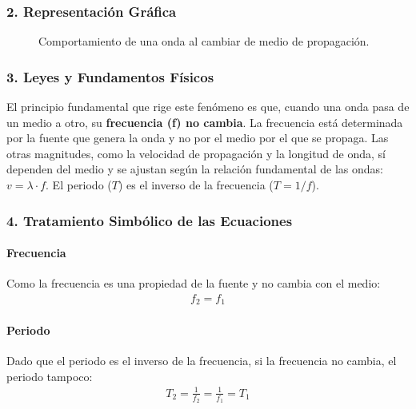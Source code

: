 \subsubsection*{2. Representación Gráfica}
\begin{figure}[H]
    \centering
    \caption{Comportamiento de una onda al cambiar de medio de propagación.}
\end{figure}

\subsubsection*{3. Leyes y Fundamentos Físicos}
El principio fundamental que rige este fenómeno es que, cuando una onda pasa de un medio a otro, su \textbf{frecuencia (f) no cambia}. La frecuencia está determinada por la fuente que genera la onda y no por el medio por el que se propaga.
Las otras magnitudes, como la velocidad de propagación y la longitud de onda, sí dependen del medio y se ajustan según la relación fundamental de las ondas: $v = \lambda \cdot f$.
El periodo ($T$) es el inverso de la frecuencia ($T=1/f$).

\subsubsection*{4. Tratamiento Simbólico de las Ecuaciones}
\paragraph{Frecuencia}
Como la frecuencia es una propiedad de la fuente y no cambia con el medio:
\begin{gather}
    f_2 = f_1
\end{gather}

\paragraph{Periodo}
Dado que el periodo es el inverso de la frecuencia, si la frecuencia no cambia, el periodo tampoco:
\begin{gather}
    T_2 = \frac{1}{f_2} = \frac{1}{f_1} = T_1
\end{gather}

